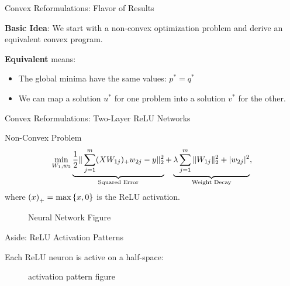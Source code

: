 \documentclass[usenames,dvipsnames,mathserif,notheorems]{beamer}
\newcommand{\bad}[1]{\textcolor{bad}{#1}}
\newcommand{\good}[1]{\textcolor{good}{#1}}
\def\showtikz{}
\begin{document}
\begin{frame}{Convex Reformulations: Flavor of Results}
	\large

	\textbf{Basic Idea}: We start with a \bad{non-convex} optimization problem and derive
	an equivalent \good{convex} program.

	\pause
	\vspace{2em}

	\textbf{Equivalent} means:
	\vspace{0.5em}
	\begin{itemize}
		\item The global minima have the same values: \( p^* = q^* \)
		      \vspace{0.5em}
		\item We can map a solution \( u^* \) for one problem into a solution
		      \( v^* \) for the other.
		      \vspace{0.5em}
	\end{itemize}

\end{frame}


\begin{frame}{Convex Reformulations: Two-Layer ReLU Networks}

	{\large \bad{Non-Convex Problem}}
	\[
		\min_{W_1, w_2} \underbrace{\frac 1 2 \|\sum_{j=1}^m (X W_{1j})_+ w_{2j} - y\|_2^2}_{\text{Squared Error}}
		+ \underbrace{\lambda \sum_{j=1}^m \|W_{1j}\|_2^2 + |w_{2j}|^2}_{\text{Weight Decay}},
	\]
	where \( \left(x\right)_+ = \max\left\{x, 0\right\} \) is the ReLU activation.
	\pause

	\begin{figure}[]
		\centering
		\ifdefined\showtikz
			
		\else
			\Huge Neural Network Figure
		\fi
	\end{figure}

\end{frame}


\begin{frame}{Aside: ReLU Activation Patterns}

	Each ReLU neuron is active on a half-space:

	\pause

	\begin{figure}[]
		\centering
		\ifdefined\showtikz
			
		\else
			\Huge activation pattern figure
		\fi
	\end{figure}


\end{frame}
\end{document}
